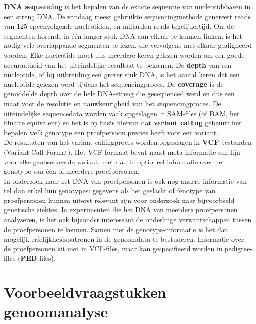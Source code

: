 \textbf{DNA sequencing} is het bepalen van de exacte sequentie van nucleotidebasen in een streng DNA. De vandaag meest gebruikte sequencingmethode genereert reads van 125 opeenvolgende nucleotiden, en miljarden reads tegelijkertijd. Om de segmenten horende in \'e\'en langer stuk DNA aan elkaar te kunnen linken, is het nodig vele overlappende segmenten te lezen, die vervolgens met elkaar gealigneerd worden. Elke nucleotide moet dus meerdere keren gelezen worden om een goede accuraatheid van het uiteindelijke resultaat te bekomen. De \textbf{depth} van een nucleotide, of bij uitbreiding een groter stuk DNA, is het aantal keren dat een nucleotide gelezen werd tijdens het sequencingproces. De \textbf{coverage} is de gemiddelde depth over de hele DNA-streng die gesequenced werd en dus een maat voor de resolutie en nauwkeurigheid van het sequencingproces. De uiteindelijke sequencedata worden vaak opgeslagen in SAM-files (of BAM, het binaire equivalent) en het is op basis hiervan dat \textbf{variant calling} gebeurt: het bepalen welk genotype een proefpersoon precies heeft voor een variant.\\
De resultaten van het variant-callingproces worden opgeslagen in \textbf{VCF}-bestanden (Variant Call Format). Het VCF-formaat bevat naast meta-informatie een lijn voor elke geobserveerde variant, met daarin optioneel informatie over het genotype van \'e\'en of meerdere proefpersonen.\\
In onderzoek naar het DNA van proefpersonen is ook nog andere informatie van tel dan enkel hun genotypes: gegevens als het geslacht of fenotype van proefpersonen kunnen uiterst relevant zijn voor onderzoek naar bijvoorbeeld genetische ziektes. In experimenten die het DNA van meerdere proefpersonen analyseren, is het ook bijzonder interessant de onderlinge verwantschappen tussen de proefpersonen te kennen. Samen met de genotype-informatie is het dan mogelijk erfelijkheidspatronen in de genoomdata te bestuderen. Informatie over de proefpersonen zit niet in VCF-files, maar kan gespecifieerd worden in pedigree-files (\textbf{PED}-files).

\section{Voorbeeldvraagstukken genoomanalyse}

